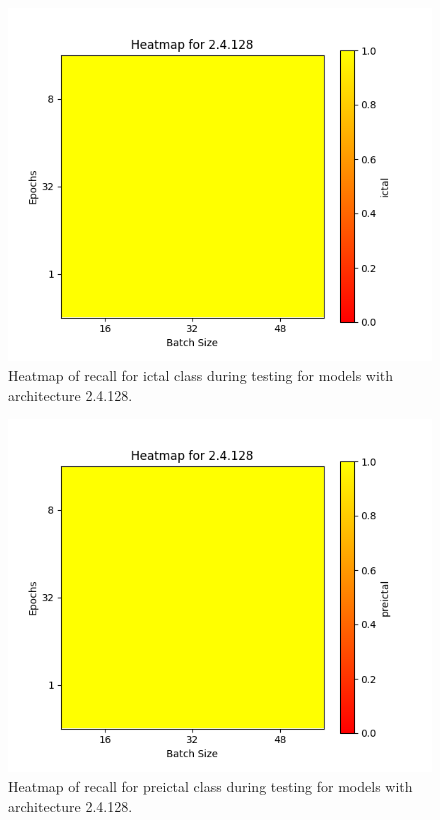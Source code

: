 \documentclass[12pt]{article}
\begin{document}
\begin{figure}[H]
\includegraphics[width=\textwidth]{heatmap_recall_ictal_2.4.128}
\centering
\caption{Heatmap of recall for ictal class during testing for models with architecture 2.4.128.}
\label{fig:time-metrics}
\end{figure}

\begin{figure}[H]
\includegraphics[width=\textwidth]{heatmap_recall_preictal_2.4.128}
\centering
\caption{Heatmap of recall for preictal class during testing for models with architecture 2.4.128.}
\label{fig:time-metrics}
\end{figure}
\end{document}
